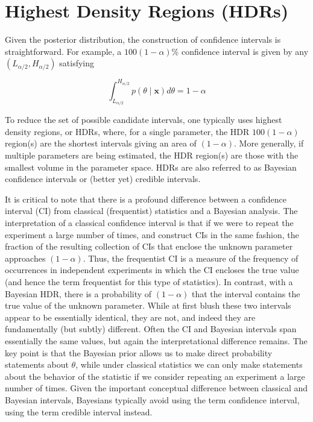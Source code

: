 \documentclass{article}
\begin{document}
\section{Highest Density Regions (HDRs)}
Given the posterior distribution, the construction of confidence intervals is straightforward. For example, a  $ 100(1 - \alpha)\% $ confidence interval is given by any  $ (L_{\alpha/2}, H_{\alpha/2}) $ satisfying

\begin{equation}
\int_{L_{\alpha/2}}^{H_{\alpha/2}}p(\theta\mid\mathbf{x})d\theta=1-\alpha
\end{equation}

To reduce the set of possible candidate intervals, one typically uses highest density regions, or HDRs, where, for a single parameter, the HDR  $ 100(1 - \alpha) $ region(s) are the shortest intervals giving an area of  $ (1 - \alpha) $. More generally, if multiple parameters are being estimated, the HDR region(s) are those with the smallest volume in the parameter space. HDRs are also referred to as Bayesian confidence intervals or (better yet) credible intervals.

It is critical to note that there is a profound difference between a confidence interval (CI) from classical (frequentist) statistics and a Bayesian analysis. The interpretation of a classical confidence interval is that if we were to repeat the experiment a large number of times, and construct CIs in the same fashion, the fraction of the resulting collection of CIs that enclose the unknown parameter approaches  $ (1 - \alpha) $. Thus, the frequentist CI is a measure of the frequency of occurrences in independent experiments in which the CI encloses the true value (and hence the term frequentist for this type of statistics). In contrast, with a Bayesian HDR, there is a probability of  $ (1 - \alpha) $ that the interval contains the true value of the unknown parameter. While at first blush these two intervals appear to be essentially identical, they are not, and indeed they are fundamentally (but subtly) different. Often the CI and Bayesian intervals span essentially the same values, but again the interpretational difference remains. The key point is that the Bayesian prior allows us to make direct probability statements about  $ \theta $, while under classical statistics we can only make statements about the behavior of the statistic if we consider repeating an experiment a large number of times. Given the important conceptual difference between classical and Bayesian intervals, Bayesians typically avoid using the term confidence interval, using the term credible interval instead.
\end{document}
